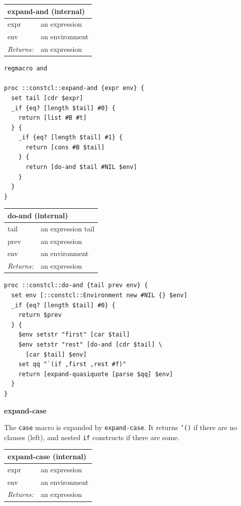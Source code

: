 \documentclass[twoside,9pt]{report}
\begin{document}
\begin{tabular}{ |l l| }
\hline
\multicolumn{2}{|l|}{expand-and (internal)} \\
\hline
expr & an expression \\
env & an environment \\
\textit{Returns:} & an expression \\
\hline
\end{tabular}

\noindent\makebox[\linewidth]{\rule{\linewidth}{0.4pt}}
\begin{lstlisting}
regmacro and
 
proc ::constcl::expand-and {expr env} {
  set tail [cdr $expr]
  _if {eq? [length $tail] #0} {
    return [list #B #t]
  } {
    _if {eq? [length $tail] #1} {
      return [cons #B $tail]
    } {
      return [do-and $tail #NIL $env]
    }
  }
}
\end{lstlisting}
\noindent\makebox[\linewidth]{\rule{\linewidth}{0.4pt}}
\begin{tabular}{ |l l| }
\hline
\multicolumn{2}{|l|}{do-and (internal)} \\
\hline
tail & an expression tail \\
prev & an expression \\
env & an environment \\
\textit{Returns:} & an expression \\
\hline
\end{tabular}

\noindent\makebox[\linewidth]{\rule{\linewidth}{0.4pt}}
\begin{lstlisting}
proc ::constcl::do-and {tail prev env} {
  set env [::constcl::Environment new #NIL {} $env]
  _if {eq? [length $tail] #0} {
    return $prev
  } {
    $env setstr "first" [car $tail]
    $env setstr "rest" [do-and [cdr $tail] \
      [car $tail] $env]
    set qq "`(if ,first ,rest #f)"
    return [expand-quasiquote [parse $qq] $env]
  }
}
\end{lstlisting}
\noindent\makebox[\linewidth]{\rule{\linewidth}{0.4pt}}

\textbf{expand-case}


The \texttt{case} macro is expanded by \texttt{expand-case}. It returns \texttt{'()} if there are no clauses (left), and nested \texttt{if} constructs if there are some.

\begin{tabular}{ |l l| }
\hline
\multicolumn{2}{|l|}{expand-case (internal)} \\
\hline
expr & an expression \\
env & an environment \\
\textit{Returns:} & an expression \\
\hline
\end{tabular}
\end{document}
